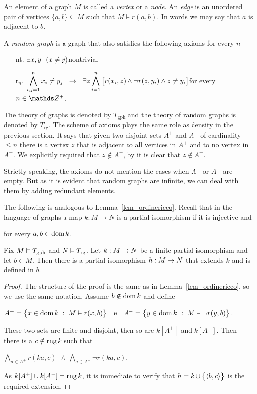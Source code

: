An element of a graph $M$ is called a \emph{vertex\/} or a \emph{node}.
An \emph{edge\/} is an unordered pair of vertices $\{a,b\}\subseteq M$ such that $M\models r(a,b)$.
In words we may say that $a$ is adjacent to $b$.

A \emph{random graph\/} is a graph that also satisfies the following axioms for every $n$
\begin{itemize}
\item[nt.] $\E x,y\ \ (x\neq y)$\hfill nontrivial
\item[r$_n$.] $\displaystyle\bigwedge^n_{i,j=1} x_i\neq y_j\ \ \imp\ \ \E z \bigwedge^n_{i=1} \big[r(x_i,z) \wedge \neg r(z,y_i) \wedge z\neq y_i\big]$\hfill for every $n\in\ZZ^+$.
\end{itemize}

The theory of graphs is denoted by \emph{$T_{\textrm{gph}}$} and the theory of random graphs is denoted by \emph{$T_{\textrm{rg}}$}.
The scheme of axioms  plays the same role as density in the previous section.
It says that given two disjoint sets $A^+$ and $A^-$ of cardinality $\le n$ there is a vertex $z$ that is adjacent to all vertices in $A^+$ and to no vertex in $A^-$.
We explicitly required that $z\notin A^-$, by  it is clear that $z\notin A^+$.

Strictly speaking, the axioms  do not mention the cases when $A^+$ or $A^-$ are empty.
But as it is evident that random graphs are infinite, we can deal with them by adding redundant elements.

The following is analogous to Lemma~\ref{lem_ordinericco}.
Recall that in the language of graphs a map $k:M\to N$ is a partial isomorphism if it is injective and

\hfill for every $a,b\in\dom k$.

\begin{lemma}\label{lem_graforicco}
Fix $M\models T_{\rm gph}$ and $N\models T_{\rm rg}$.
Let $k:M\imp N$ be a finite partial isomorphism and let $b\in M$.
Then there is a partial isomorphism $h:M\imp N$ that extends $k$ and is defined in $b$.
\end{lemma}
\begin{proof} The structure of the proof is the same as in Lemma~\ref{lem_ordinericco}, so we use the same notation.
Assume $b\notin\dom k$ and define\medskip

\hfil$A^+=\big\{x\in\dom k\ :\ M\models r(x,b)\big\}\ \ \ \textrm{e}\ \ \ A^-=\big\{y\in\dom k\ :\  M\models \neg r(y,b)\big\}$.\medskip

These two sets are finite and disjoint, then so are $k[A^+]$ and $k[A^-]$.
Then there is a $c\notin\range k$ such that\medskip

\hfil$\displaystyle\bigwedge_{a\in A^+}r(ka,c)\ \ \wedge\ \bigwedge_{a\in A^-}\neg r(ka,c)$.

As $k[A^+]\cup k[A^-]=\range k$, it is immediate to verify that $h=k\cup\big\{\<b,c\>\big\}$ is the required extension.
\end{proof}

